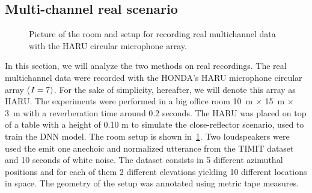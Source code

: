\subsection{Multi-channel real scenario}
\begin{figure}[t]
    \begin{fullwidth}
    \centering
    \hfill
    \hfill
    \label{fig:mirage:room_exp}
    \caption{Picture of the room and setup for recording real multichannel data with the HARU circular microphone array.}
    \end{fullwidth}
\end{figure}
In this section, we will analyze the two methods on real recordings.
The real multichannel data were recorded with the HONDA's HARU microphone circular array ($I=7)$.
For the sake of simplicity, hereafter, we will denote this array as HARU.
The experiments were performed in a big office room 10~m $\times$ 15~m $\times$ 3~m with a reverberation time around 0.2 seconds.
The HARU was placed on top of a table with a height of 0.10 m to simulate the close-reflector scenario, used to train the \ac{DNN} model.
The room setup is shown in~\cref{fig:mirage:room_exp}.
Two loudspeakers were used the emit one anechoic and normalized utterance from the TIMIT dataset and 10 seconds of white noise.
The dataset consists in 5 different azimuthal positions and for each of them 2 different elevations yielding 10 different locations in space.
The geometry of the setup was annotated using metric tape measures.


